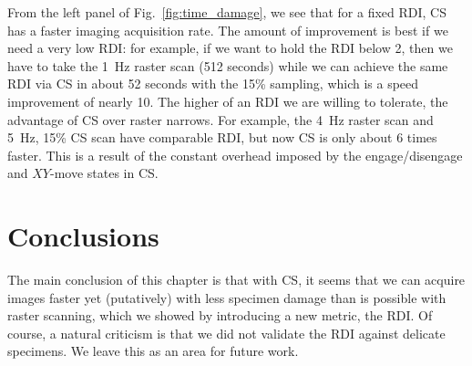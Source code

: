 \documentclass[twocolumn,oneside]{IEEEtran/IEEEtran}
\begin{document}
From the left panel of Fig.~\ref{fig:time_damage}, we see that for a fixed RDI,
CS has a faster imaging acquisition rate. The amount of improvement is best if
we need a very low RDI: for example, if we want to hold the RDI below 2, then we
have to take the 1~Hz raster scan (512 seconds) while we can achieve the same
RDI via CS in about 52 seconds with the 15\% sampling, which is a speed
improvement of nearly 10. The higher of an RDI we are willing to tolerate, the
advantage of CS over raster narrows. For example, the 4~Hz raster scan and 5~Hz,
15\% CS scan have comparable RDI, but now CS is only about 6 times faster. This
is a result of the constant overhead imposed by the engage/disengage and
$XY$-move states in CS.

\section{Conclusions}\label{sec:conclusions}
The main conclusion of this chapter is that with CS, it seems that we can
acquire images faster yet (putatively) with less specimen damage than is
possible with raster scanning, which we showed by introducing a new metric, the
RDI. Of course, a natural criticism is that we did not validate the RDI against
delicate specimens. We leave this as an area for future work.








\end{document}
